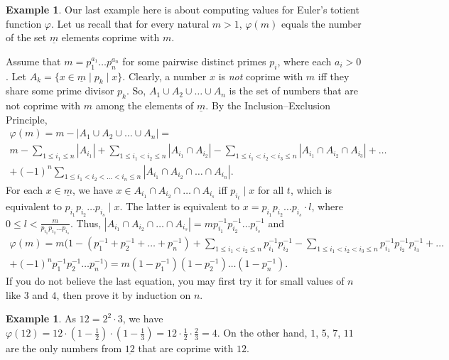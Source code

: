 \documentclass[12pt,notitlepage]{article}
\theoremstyle{plain}
\theoremstyle{definition}
\newtheorem{exm}[thm]{Example}
\theoremstyle{plain}
\renewcommand{\phi}{\varphi}
\newcommand{\ul}[1]{\underline{#1}}
\newcommand{\1}{\mathbf{1}}
\newcommand{\0}{\mathbf{0}}
\newcommand{\dvd}{\mathop{\mid}}
\begin{document}
\begin{exm}
Our last example here is about computing values for Euler's totient function $\phi$. Let us recall that for every natural $m > 1$, $\phi(m)$ equals the number of the set $\ul{m}$ elements coprime with $m$.

Assume that $m = p^{a_1}_1\ldots p_n^{a_n}$ for some pairwise distinct primes $p_i$, where each $a_i > 0$. Let $A_k = \{ x \in \ul{m} \mid p_k \dvd x \}$. Clearly, a number $x$ is \emph{not} coprime with $m$ iff they share some prime divisor $p_k$. So, $A_1 \cup A_2 \cup \ldots \cup A_n$ is the set of numbers that are not coprime with $m$ among the elements of $\ul{m}$. By the Inclusion--Exclusion Principle,
\begin{multline*}
\phi(m) = m - |A_1 \cup A_2 \cup \ldots \cup A_n| = \\
 m - \sum\limits_{1\leqslant i_1 \leqslant n} |A_{i_1}| + \sum\limits_{1\leqslant i_1 < i_2 \leqslant n} |A_{i_1} \cap A_{i_2}| - \sum\limits_{1\leqslant i_1 < i_2 < i_3 \leqslant n} |A_{i_1} \cap A_{i_2} \cap A_{i_3}| + \ldots\\
+ (-1)^{n} \sum\limits_{1\leqslant i_1 < i_2 < \ldots < i_n \leqslant n} |A_{i_1} \cap A_{i_2} \cap \ldots \cap A_{i_n}|.
\end{multline*}
For each $x \in \ul{m}$, we have $x \in A_{i_1} \cap A_{i_2} \cap \ldots \cap A_{i_s}$ iff  $p_{i_t} \dvd x$ for all $t$, which is equivalent to $p_{i_1} p_{i_2} \ldots p_{i_s} \dvd x$. The latter is equivalent to $x =  p_{i_1} p_{i_2} \ldots p_{i_s} \cdot l$, where $0 \leq l < \frac{m}{p_{i_1} p_{i_2} \ldots p_{i_s}}$. Thus, $|A_{i_1} \cap A_{i_2} \cap \ldots \cap A_{i_s}| = m p^{-1}_{i_1} p^{-1}_{i_2} \ldots p^{-1}_{i_s}$ and
\begin{multline*}
\phi(m) = m \bigl(1  - (p^{-1}_{1} + p^{-1}_2 + \ldots + p^{-1}_n) + \sum\limits_{1\leqslant i_1 < i_2 \leqslant n} p^{-1}_{i_1} p^{-1}_{i_2} - \sum\limits_{1\leqslant i_1 < i_2 < i_3 \leqslant n} p^{-1}_{i_1} p^{-1}_{i_2} p^{-1}_{i_3} + \ldots\\
+ (-1)^{n}  p^{-1}_{1} p^{-1}_{2} \ldots  p^{-1}_{n} \bigr) = m (1 - p^{-1}_1) (1 - p^{-1}_2) \ldots (1 - p^{-1}_n).
\end{multline*}
If you do not believe the last equation, you may first try it for small values of $n$ like $3$ and $4$, then prove it by induction on $n$.
\end{exm}
\begin{exm}
As $12 = 2^2 \cdot 3$, we have $\phi(12) = 12 \cdot (1 - \frac{1}{2})\cdot (1 - \frac{1}{3}) = 12 \cdot \frac{1}{2} \cdot \frac{2}{3} = 4$. On the other hand, $1$, $5$, $7$, $11$ are the only numbers from $\ul{12}$ that are coprime with $12$.
\end{exm}
\end{document}
